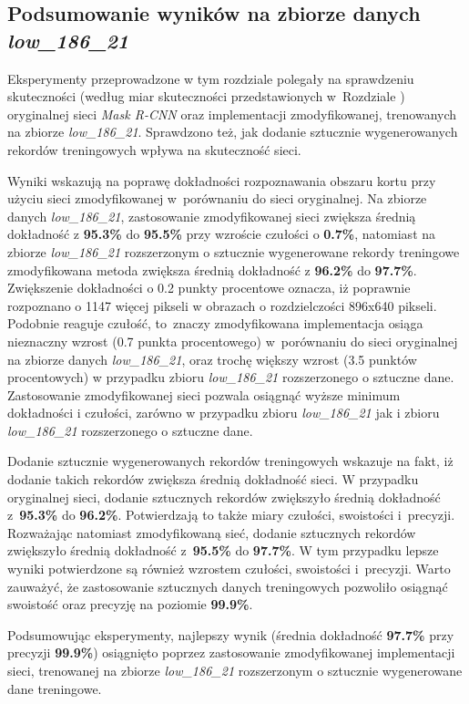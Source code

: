 \subsection{Podsumowanie wyników na zbiorze danych \textit{low\_186\_21}}
Eksperymenty przeprowadzone w tym rozdziale polegały na sprawdzeniu skuteczności (według miar skuteczności przedstawionych w~Rozdziale ) oryginalnej sieci \textit{Mask R-CNN} oraz implementacji zmodyfikowanej, trenowanych na zbiorze \textit{low\_186\_21}.
Sprawdzono też, jak dodanie sztucznie wygenerowanych rekordów treningowych wpływa na skuteczność sieci.


Wyniki wskazują na poprawę dokładności rozpoznawania obszaru kortu przy użyciu sieci zmodyfikowanej w~porównaniu do sieci oryginalnej.
Na zbiorze danych \textit{low\_186\_21}, zastosowanie zmodyfikowanej sieci zwiększa średnią dokładność z \textbf{95.3\%} do \textbf{95.5\%} przy wzroście czułości o \textbf{0.7\%}, natomiast na zbiorze \textit{low\_186\_21} rozszerzonym o sztucznie wygenerowane rekordy treningowe zmodyfikowana metoda zwiększa średnią dokładność z \textbf{96.2\%} do \textbf{97.7\%}. Zwiększenie dokładności o 0.2 punkty procentowe oznacza, iż poprawnie rozpoznano o 1147 więcej pikseli w obrazach o rozdzielczości 896x640 pikseli.
Podobnie reaguje czułość, to~znaczy zmodyfikowana implementacja osiąga nieznaczny wzrost (0.7 punkta procentowego) w~porównaniu do sieci oryginalnej na zbiorze danych \textit{low\_186\_21}, oraz trochę większy wzrost (3.5 punktów procentowych) w przypadku zbioru \textit{low\_186\_21} rozszerzonego o sztuczne dane. Zastosowanie zmodyfikowanej sieci pozwala osiągnąć wyższe minimum dokładności i czułości, zarówno w przypadku zbioru \textit{low\_186\_21} jak i zbioru \textit{low\_186\_21} rozszerzonego o sztuczne dane.


Dodanie sztucznie wygenerowanych rekordów treningowych wskazuje na fakt, iż dodanie takich rekordów zwiększa średnią dokładność sieci. W przypadku oryginalnej sieci, dodanie sztucznych rekordów zwiększyło średnią dokładność z~\textbf{95.3\%} do \textbf{96.2\%}. Potwierdzają to także miary czułości, swoistości i~precyzji. Rozważając natomiast zmodyfikowaną sieć, dodanie sztucznych rekordów zwiększyło średnią dokładność z~\textbf{95.5\%} do \textbf{97.7\%}. W tym przypadku lepsze wyniki potwierdzone są również wzrostem czułości, swoistości i~precyzji. Warto zauważyć, że zastosowanie sztucznych danych treningowych pozwoliło osiągnąć swoistość oraz precyzję na poziomie \textbf{99.9\%}.


Podsumowując eksperymenty, najlepszy wynik (średnia dokładność \textbf{97.7\%} przy precyzji \textbf{99.9\%}) osiągnięto poprzez zastosowanie zmodyfikowanej implementacji sieci, trenowanej na zbiorze \textit{low\_186\_21} rozszerzonym o sztucznie wygenerowane dane treningowe.
